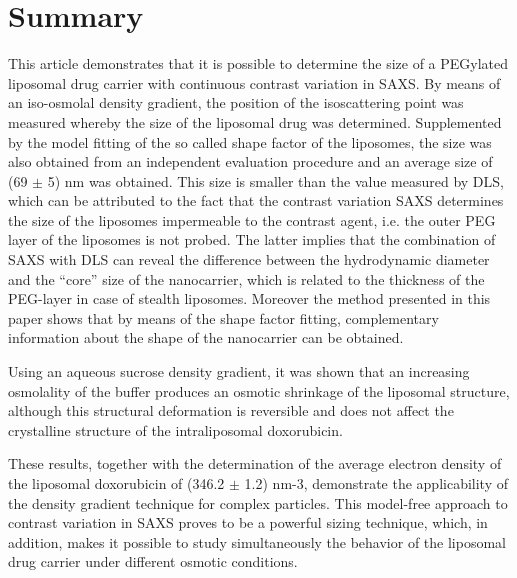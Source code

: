\section{Summary}
This article demonstrates that it is possible to determine the size of a PEGylated liposomal drug carrier with continuous contrast variation in SAXS. By means of an iso-osmolal density gradient, the position of the isoscattering point was measured whereby the size of the liposomal drug was determined. Supplemented by the model fitting of the so called shape factor of the liposomes, the size was also obtained from an independent evaluation procedure and an average size of (69 $\pm$ 5) nm was obtained. This size is smaller than the value measured by DLS, which can be attributed to the fact that the contrast variation SAXS determines the size of the liposomes impermeable to the contrast agent, i.e. the outer PEG layer of the liposomes is not probed. The latter implies that the combination of SAXS with DLS can reveal the difference between the hydrodynamic diameter and the “core” size of the nanocarrier, which is related to the thickness of the PEG-layer in case of stealth liposomes. Moreover the method presented in this paper shows that by means of the shape factor fitting, complementary information about the shape of the nanocarrier can be obtained.

Using an aqueous sucrose density gradient, it was shown that an increasing osmolality of the buffer produces an osmotic shrinkage of the liposomal structure, although this structural deformation is reversible and does not affect the crystalline structure of the intraliposomal doxorubicin.

These results, together with the determination of the average electron density of the liposomal doxorubicin of (346.2 $\pm$ 1.2) nm-3, demonstrate the applicability of the density gradient technique for complex particles. This model-free approach to contrast variation in SAXS proves to be a powerful sizing technique, which, in addition, makes it possible to study simultaneously the behavior of the liposomal drug carrier under different osmotic conditions.



